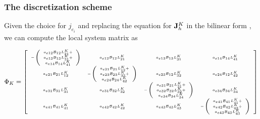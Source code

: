 \subsubsection{The discretization scheme}

Given the choice for $j_{e_i}$ and replacing the equation for $\mathbf{J}_h^K$ in the bilinear form , we can compute the local system matrix as

\begin{equation}
\Phi_K  = 
{
\tiny 
\left[
\begin{array}{cccc}
- \left( \begin{array}{c}
a_{e12}\mathcal{B}_{12}L^K_{21} + \\
a_{e13}\mathcal{B}_{13}L^K_{31} + \\
a_{e14}\mathcal{B}_{14}L^K_{41}
\end{array} \right)

& a_{e12}\mathcal{B}_{12}L^K_{21} 
& a_{e13}\mathcal{B}_{13}L^K_{31}
& a_{e14}\mathcal{B}_{14}L^K_{41}
\\

a_{e21}\mathcal{B}_{21}L^K_{12}
&
- \left( \begin{array}{c}
a_{e21}\mathcal{B}_{21}L^K_{12} + \\
a_{e23}\mathcal{B}_{23}L^K_{32} + \\
a_{e24}\mathcal{B}_{24}L^K_{42}
\end{array} \right)
& a_{e23}\mathcal{B}_{12}L^K_{32}
& a_{e24}\mathcal{B}_{12}L^K_{42}
\\

a_{e31}\mathcal{B}_{31}L^K_{31}
& a_{e31}\mathcal{B}_{32}L^K_{32}
&
- \left( \begin{array}{c}
a_{e31}\mathcal{B}_{31}L^K_{31} + \\
a_{e32}\mathcal{B}_{32}L^K_{32} + \\
a_{e34}\mathcal{B}_{34}L^K_{34}
\end{array} \right)

&a_{e34}\mathcal{B}_{34}L^K_{34}
\\

a_{e41}\mathcal{B}_{41}L^K_{41}
& a_{e42}\mathcal{B}_{42}L^K_{42}
&a_{e43}\mathcal{B}_{43}L^K_{43}
&
- \left( \begin{array}{c}
a_{e41}\mathcal{B}_{41}L^K_{41} + \\
a_{e42}\mathcal{B}_{42}L^K_{42} + \\
a_{e43}\mathcal{B}_{43}L^K_{43}
\end{array} \right)

\end{array}
\right]
}
\end{equation}

